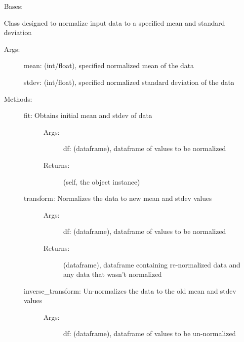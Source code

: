 \documentclass[letterpaper,10pt,english]{sphinxmanual}
\begin{document}
\begin{fulllineitems}
\label{\detokenize{api/mastml.preprocessing.MeanStdevScaler:mastml.preprocessing.MeanStdevScaler}}
Bases: {\hyperref[\detokenize{api/mastml.preprocessing.BasePreprocessor:mastml.preprocessing.BasePreprocessor}]{}}

Class designed to normalize input data to a specified mean and standard deviation
\begin{description}
\item[{Args:}] \leavevmode
mean: (int/float), specified normalized mean of the data

stdev: (int/float), specified normalized standard deviation of the data

\item[{Methods:}] \leavevmode\begin{description}
\item[{fit: Obtains initial mean and stdev of data}] \leavevmode\begin{description}
\item[{Args:}] \leavevmode
df: (dataframe), dataframe of values to be normalized

\item[{Returns:}] \leavevmode
(self, the object instance)

\end{description}

\item[{transform: Normalizes the data to new mean and stdev values}] \leavevmode\begin{description}
\item[{Args:}] \leavevmode
df: (dataframe), dataframe of values to be normalized

\item[{Returns:}] \leavevmode
(dataframe), dataframe containing re-normalized data and any data that wasn’t normalized

\end{description}

\item[{inverse\_transform: Un-normalizes the data to the old mean and stdev values}] \leavevmode\begin{description}
\item[{Args:}] \leavevmode
df: (dataframe), dataframe of values to be un-normalized


\end{description}
\end{description}
\end{description}
\end{fulllineitems}
\end{document}
